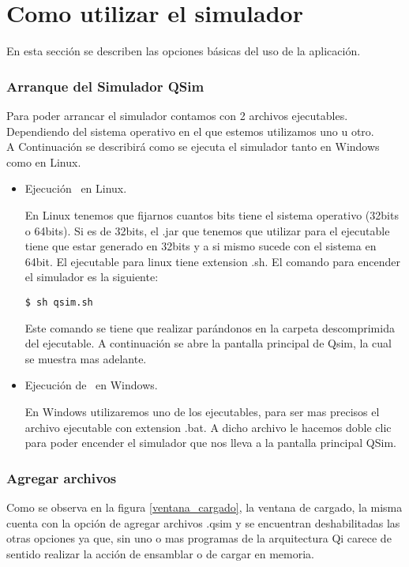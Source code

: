 \section{Como utilizar el simulador}

En esta sección se describen las opciones básicas del uso de la aplicación.

\subsubsection{Arranque del Simulador QSim}
Para poder arrancar el simulador contamos con 2 archivos ejecutables. 
Dependiendo del sistema operativo en el que estemos utilizamos uno u otro.\\

A Continuación se describirá como se ejecuta el simulador \qsim tanto en Windows como en Linux.
\begin{itemize}

\item Ejecución \qsim\ en Linux.

En Linux tenemos que fijarnos cuantos bits tiene el sistema operativo (32bits o 64bits). Si es de 32bits, el .jar que tenemos que utilizar para el ejecutable tiene que estar generado en 32bits y a si mismo sucede con el sistema en 64bit. El ejecutable para linux tiene extension .sh. El comando para encender el simulador es la siguiente:

\begin{verbatim}
$ sh qsim.sh
\end{verbatim}

Este comando se tiene que realizar parándonos en la carpeta descomprimida del ejecutable. 
A continuación se abre la pantalla principal de Qsim, la cual se muestra mas adelante.

\item Ejecución de \qsim\ en Windows.

En Windows utilizaremos uno de los ejecutables, para ser mas precisos el archivo ejecutable con extension .bat.
A dicho archivo le hacemos doble clic para poder encender el simulador que nos lleva a la pantalla principal QSim.

 
\end{itemize}

\subsubsection{Agregar archivos}
Como se observa en la figura \ref{ventana_cargado}, la ventana de cargado, la misma cuenta con la opción de agregar archivos .qsim y se encuentran deshabilitadas las otras opciones ya que, sin uno o mas programas de la arquitectura Qi carece de sentido realizar la acción de ensamblar o de cargar en memoria.

